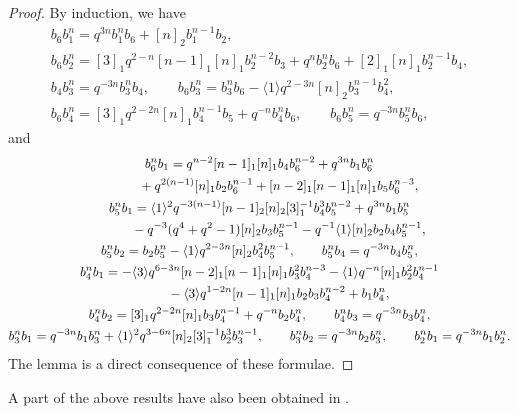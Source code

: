\documentclass[11pt]{article}
\def\qmq#1{\langle #1 \rangle}
\begin{document}
\begin{proof} By induction, we have
\begin{gather*}
 b_6 b_1^n = q^{3 n} b_1^n b_6+[n]_2 b_1^{n-1} b_2,\\
 b_6 b_2^n = [3]_1 q^{2-n} [n-1]_1 [n]_1 b_2^{n-2} b_3+q^n b_2^n b_6+[2]_1 [n]_1 b_2^{n-1} b_4,\\
 b_4 b_3^n = q^{-3 n} b_3^n b_4,\qquad
 b_6 b_3^n = b_3^n b_6-\qmq{1} q^{2-3 n} [n]_2 b_3^{n-1} b_4^2,\\
 b_6 b_4^n = [3]_1 q^{2-2 n} [n]_1 b_4^{n-1} b_5+q^{-n} b_4^n b_6, \qquad
 b_6 b_5^n = q^{-3 n} b_5^n b_6,
 \end{gather*}
and
\begin{gather*}
 b_6^n b_1 = q^{n-2} [n-1]_1 [n]_1 b_4 b_6^{n-2}+q^{3 n} b_1 b_6^n \\
\hphantom{b_6^n b_1 =}{}
 +q^{2 (n-1)} [n]_1 b_2 b_6^{n-1}+[n-2]_1 [n-1]_1 [n]_1 b_5 b_6^{n-3},\\
 b_5^n b_1 = \qmq{1}^2 q^{-3 (n-1)} [n-1]_2 [n]_2 [3]_1^{-1}b_4^3 b_5^{n-2}+q^{3 n} b_1 b_5^n\\
\hphantom{b_5^n b_1 =}{}
 -q^{-3}(q^4+q^2-1) [n]_2 b_3 b_5^{n-1}-q^{-1}\qmq{1} [n]_2 b_2 b_4 b_5^{n-1},\\
 b_5^n b_2 = b_2 b_5^n-\qmq{1} q^{2-3 n} [n]_2 b_4^2 b_5^{n-1},\qquad
 b_5^n b_4 = q^{-3 n} b_4 b_5^n,\\
 b_4^n b_1 = -\qmq{3} q^{6-3 n} [n-2]_1 [n-1]_1 [n]_1 b_3^2 b_4^{n-3}-\qmq{1} q^{-n} [n]_1b_2^2 b_4^{n-1}\\
\hphantom{b_4^n b_1 =}{}
 -\qmq{3} q^{1-2 n} [n-1]_1 [n]_1 b_2 b_3 b_4^{n-2}+b_1 b_4^n,\\
 b_4^n b_2 = [3]_1 q^{2-2 n} [n]_1 b_3 b_4^{n-1}+q^{-n} b_2 b_4^n,\qquad
 b_4^n b_3 = q^{-3 n} b_3 b_4^n,\\
 b_3^n b_1 = q^{-3 n} b_1 b_3^n+\qmq{1}^2 q^{3-6 n} [n]_2 [3]_1^{-1}b_2^3 b_3^{n-1},\qquad
 b_3^n b_2 = q^{-3 n} b_2 b_3^n,\qquad
 b_2^n b_1 = q^{-3 n} b_1 b_2^n.
\end{gather*}
The lemma is a direct consequence of these formulae.
\end{proof}

A part of the above results have also been obtained in \cite{Xi95}.
\end{document}
